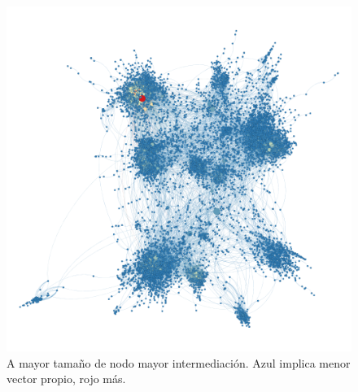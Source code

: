 \begin{figure}[ht]
    \centering
    \includegraphics[width=1\textwidth,angle=90]{img/resultados/intermediacion-vectorPropio.png}
    \caption{A mayor tamaño de nodo mayor intermediación. Azul implica menor vector propio, rojo más.}
\end{figure}